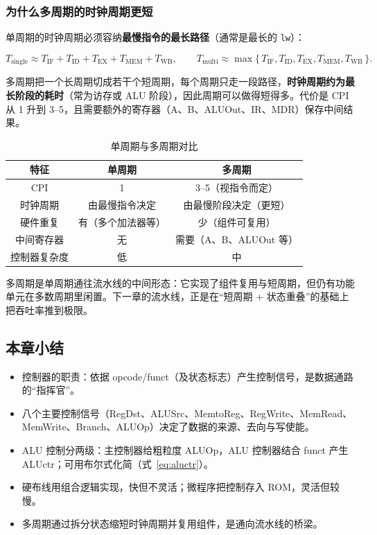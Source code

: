 \subsubsection{为什么多周期的时钟周期更短}

单周期的时钟周期必须容纳\textbf{最慢指令的最长路径}（通常是最长的 \texttt{lw}）：

\begin{equation}
T_{\text{single}} \approx T_{\text{IF}} + T_{\text{ID}} + T_{\text{EX}} + T_{\text{MEM}} + T_{\text{WB}},
\qquad
T_{\text{multi}} \approx \max\{\,T_{\text{IF}}, T_{\text{ID}}, T_{\text{EX}}, T_{\text{MEM}}, T_{\text{WB}}\,\}.
\label{eq:period}
\end{equation}

多周期把一个长周期切成若干个短周期，每个周期只走一段路径，\textbf{时钟周期约为最长阶段的耗时}（常为访存或 ALU 阶段），因此周期可以做得短得多。代价是 CPI 从 1 升到 3--5，且需要额外的寄存器（A、B、ALUOut、IR、MDR）保存中间结果。

\begin{table}[H]
\centering
\caption{单周期与多周期对比}
\label{tab:single_vs_multi}
\begin{tabulary}{\textwidth}{CCC}
\toprule
\textbf{特征} & \textbf{单周期} & \textbf{多周期} \\
\midrule
CPI & 1 & 3--5（视指令而定） \\
时钟周期 & 由最慢指令决定 & 由最慢阶段决定（更短） \\
硬件重复 & 有（多个加法器等） & 少（组件可复用） \\
中间寄存器 & 无 & 需要（A、B、ALUOut 等） \\
控制器复杂度 & 低 & 中 \\
\bottomrule
\end{tabulary}
\end{table}

多周期是单周期通往流水线的中间形态：它实现了组件复用与短周期，但仍有功能单元在多数周期里闲置。下一章的流水线，正是在“短周期 $+$ 状态重叠”的基础上把吞吐率推到极限。

\subsection{本章小结}

\begin{itemize}
    \item 控制器的职责：依据 opcode/funct（及状态标志）产生控制信号，是数据通路的“指挥官”。
    \item 八个主要控制信号（RegDst、ALUSrc、MemtoReg、RegWrite、MemRead、MemWrite、Branch、ALUOp）决定了数据的来源、去向与写使能。
    \item ALU 控制分两级：主控制器给粗粒度 ALUOp，ALU 控制器结合 funct 产生 ALUctr；可用布尔式化简（式~\ref{eq:aluctr}）。
    \item 硬布线用组合逻辑实现，快但不灵活；微程序把控制存入 ROM，灵活但较慢。
    \item 多周期通过拆分状态缩短时钟周期并复用组件，是通向流水线的桥梁。
\end{itemize}

